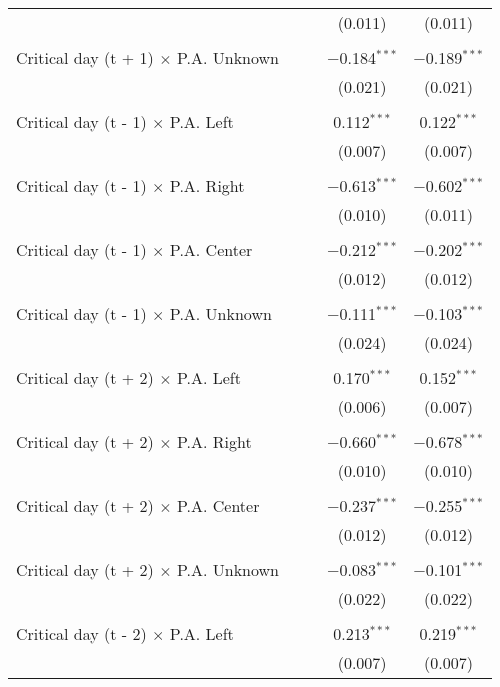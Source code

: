 \documentclass[
]{article}
\begin{document}
\begin{table}[!htbp]
{\begin{tabular}{@{\extracolsep{5pt}}lcccc}
  &  &  & (0.011) & (0.011) \\ 
  & & & & \\ 
 Critical day (t + 1) $\times$ P.A. Unknown &  &  & $-$0.184$^{***}$ & $-$0.189$^{***}$ \\ 
  &  &  & (0.021) & (0.021) \\ 
  & & & & \\ 
 Critical day (t - 1) $\times$ P.A. Left &  &  & 0.112$^{***}$ & 0.122$^{***}$ \\ 
  &  &  & (0.007) & (0.007) \\ 
  & & & & \\ 
 Critical day (t - 1) $\times$ P.A. Right &  &  & $-$0.613$^{***}$ & $-$0.602$^{***}$ \\ 
  &  &  & (0.010) & (0.011) \\ 
  & & & & \\ 
 Critical day (t - 1) $\times$ P.A. Center &  &  & $-$0.212$^{***}$ & $-$0.202$^{***}$ \\ 
  &  &  & (0.012) & (0.012) \\ 
  & & & & \\ 
 Critical day (t - 1) $\times$ P.A. Unknown &  &  & $-$0.111$^{***}$ & $-$0.103$^{***}$ \\ 
  &  &  & (0.024) & (0.024) \\ 
  & & & & \\ 
 Critical day (t + 2) $\times$ P.A. Left &  &  & 0.170$^{***}$ & 0.152$^{***}$ \\ 
  &  &  & (0.006) & (0.007) \\ 
  & & & & \\ 
 Critical day (t + 2) $\times$ P.A. Right &  &  & $-$0.660$^{***}$ & $-$0.678$^{***}$ \\ 
  &  &  & (0.010) & (0.010) \\ 
  & & & & \\ 
 Critical day (t + 2) $\times$ P.A. Center &  &  & $-$0.237$^{***}$ & $-$0.255$^{***}$ \\ 
  &  &  & (0.012) & (0.012) \\ 
  & & & & \\ 
 Critical day (t + 2) $\times$ P.A. Unknown &  &  & $-$0.083$^{***}$ & $-$0.101$^{***}$ \\ 
  &  &  & (0.022) & (0.022) \\ 
  & & & & \\ 
 Critical day (t - 2) $\times$ P.A. Left &  &  & 0.213$^{***}$ & 0.219$^{***}$ \\ 
  &  &  & (0.007) & (0.007) \\ 

\end{tabular}}
\end{table}
\end{document}
